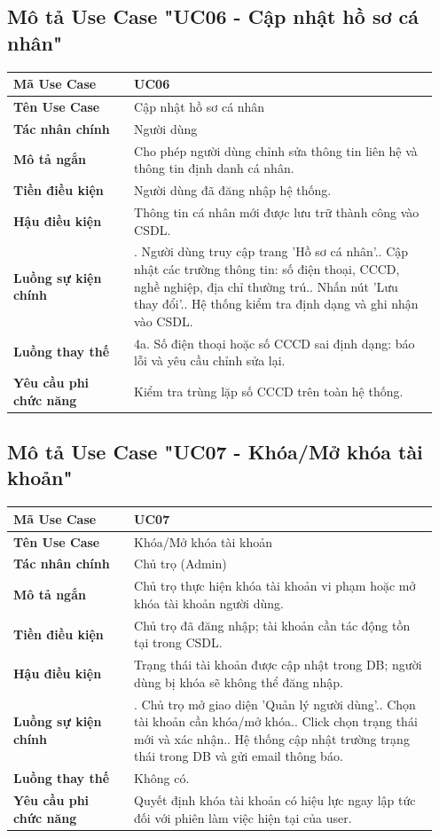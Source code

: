 \documentclass[a4paper,oneside]{report}
\begin{document}
\subsection{Mô tả Use Case "UC06 - Cập nhật hồ sơ cá nhân"}

\begin{longtable}[]{@{}>{\RaggedRight\arraybackslash}p{0.27\linewidth}>{\RaggedRight\arraybackslash}p{0.68\linewidth}@{}}
\toprule
\textbf{Mã Use Case} & UC06\tabularnewline
\midrule
\endhead
\textbf{Tên Use Case} & Cập nhật hồ sơ cá nhân\tabularnewline
\textbf{Tác nhân chính} & Người dùng\tabularnewline
\textbf{Mô tả ngắn} & Cho phép người dùng chỉnh sửa thông tin liên hệ và
thông tin định danh cá nhân.\tabularnewline
\textbf{Tiền điều kiện} & Người dùng đã đăng nhập hệ
thống.\tabularnewline
\textbf{Hậu điều kiện} & Thông tin cá nhân mới được lưu trữ thành công
vào CSDL.\tabularnewline
\textbf{Luồng sự kiện chính} & 1. Người dùng truy cập
trang 'Hồ sơ cá nhân'.\newline 2. Cập nhật các trường thông tin: số
điện thoại, CCCD, nghề nghiệp, địa chỉ thường trú.\newline 3. Nhấn
nút 'Lưu thay đổi'.\newline 4. Hệ thống kiểm tra định dạng và ghi
nhận vào CSDL.\tabularnewline
\textbf{Luồng thay thế} & 4a. Số điện thoại hoặc số CCCD sai định dạng:
báo lỗi và yêu cầu chỉnh sửa lại.\tabularnewline
\textbf{Yêu cầu phi chức năng} & Kiểm tra trùng lặp số CCCD trên toàn hệ
thống.\tabularnewline
\bottomrule
\end{longtable}

\subsection{Mô tả Use Case "UC07 - Khóa/Mở khóa tài khoản"}

\begin{longtable}[]{@{}>{\RaggedRight\arraybackslash}p{0.27\linewidth}>{\RaggedRight\arraybackslash}p{0.68\linewidth}@{}}
\toprule
\textbf{Mã Use Case} & UC07\tabularnewline
\midrule
\endhead
\textbf{Tên Use Case} & Khóa/Mở khóa tài khoản\tabularnewline
\textbf{Tác nhân chính} & Chủ trọ (Admin)\tabularnewline
\textbf{Mô tả ngắn} & Chủ trọ thực hiện khóa tài khoản vi phạm hoặc mở
khóa tài khoản người dùng.\tabularnewline
\textbf{Tiền điều kiện} & Chủ trọ đã đăng nhập; tài khoản cần tác động
tồn tại trong CSDL.\tabularnewline
\textbf{Hậu điều kiện} & Trạng thái tài khoản được cập nhật trong DB;
người dùng bị khóa sẽ không thể đăng nhập.\tabularnewline
\textbf{Luồng sự kiện chính} & 1. Chủ trọ mở giao
diện 'Quản lý người dùng'.\newline 2. Chọn tài khoản cần khóa/mở
khóa.\newline 3. Click chọn trạng thái mới và xác
nhận.\newline 4. Hệ thống cập nhật trường trạng thái trong DB và
gửi email thông báo.\tabularnewline
\textbf{Luồng thay thế} & Không có.\tabularnewline
\textbf{Yêu cầu phi chức năng} & Quyết định khóa tài khoản có hiệu lực
ngay lập tức đối với phiên làm việc hiện tại của user.\tabularnewline
\bottomrule
\end{longtable}
\end{document}

